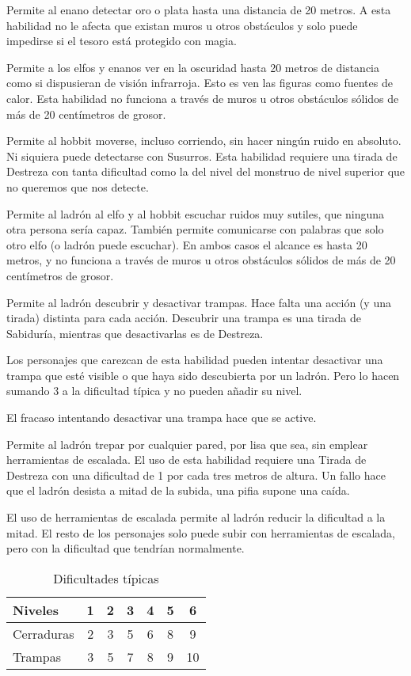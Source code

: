 \begin{multicols}{2}
 Permite al enano detectar oro o plata hasta una distancia
de 20 metros. A esta habilidad no le afecta que existan muros u otros obstáculos
y solo puede impedirse si el tesoro está protegido con magia.

 Permite a los elfos y enanos ver en la oscuridad hasta
20 metros de distancia como si dispusieran de visión infrarroja. Esto es ven las
figuras como fuentes de calor. Esta habilidad no funciona a través de muros u
otros obstáculos sólidos de más de 20 centímetros de grosor.

 Permite al hobbit moverse, incluso corriendo, sin hacer
ningún ruido en absoluto. Ni siquiera puede detectarse con Susurros. Esta habilidad
requiere una tirada de Destreza con tanta dificultad como la del nivel del monstruo
de nivel superior que no queremos que nos detecte.

 Permite al ladrón al elfo y al hobbit escuchar ruidos muy sutiles,
que ninguna otra persona sería capaz. También permite comunicarse con palabras
que solo otro elfo (o ladrón puede escuchar). En ambos casos el alcance es hasta
20 metros, y no funciona a través de muros u otros obstáculos sólidos de más de 20
centímetros de grosor.

 Permite al ladrón descubrir y desactivar trampas. Hace
falta una acción (y una tirada) distinta para cada acción. Descubrir una trampa
es una tirada de Sabiduría, mientras que desactivarlas es de Destreza.

Los personajes que carezcan de esta habilidad pueden intentar desactivar una
trampa que esté visible o que haya sido descubierta por un ladrón. Pero lo hacen
sumando 3 a la dificultad típica y no pueden añadir su nivel.

El fracaso intentando desactivar una trampa hace que se active.

 Permite al ladrón trepar por cualquier pared,
por lisa que sea, sin emplear herramientas de escalada. El uso de esta habilidad
requiere una Tirada de Destreza con una dificultad de 1 por cada tres metros de
altura. Un fallo hace que el ladrón desista a mitad de la subida, una pifia
supone una caída.

El uso de herramientas de escalada permite al ladrón reducir la dificultad a la
mitad. El resto de los personajes solo puede subir con herramientas de escalada,
pero con la dificultad que tendrían normalmente.

\begin{table*}[p]
\centering
\caption{Dificultades típicas}
\label{t:dif_tip}
\begin{tabular}{lcccccc}
\toprule
Niveles    & 1 & 2 & 3 & 4 & 5 & 6\\
\midrule
Cerraduras & 2 & 3 & 5 & 6 & 8 & 9\\
Trampas    & 3 & 5 & 7 & 8 & 9 & 10\\
\bottomrule
\end{tabular}
\end{table*}


\end{multicols}

